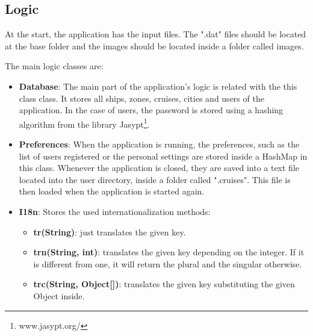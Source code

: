 \documentclass[11pt]{article}
\begin{document}
   \subsection{Logic}
   At the start, the application has the input files. The ".dat" files should be located at the base folder and the images should be located inside a folder called images.
   
   The main logic classes are:
   \begin{itemize}
	   	\item \textbf{Database}: The main part of the application's logic is related with the this class class. It stores all ships, zones, cruises, cities and users of the application. In the case of users, the password is stored using a hashing algorithm from the library Jasypt\footnote{www.jasypt.org/}.
	   	\item \textbf{Preferences}: When the application is running, the preferences, such as the list of users registered or the personal settings are stored inside a HashMap in this class. Whenever the application is closed, they are saved into a text file located into the user directory, inside a folder called ".cruises". This file is then loaded when the application is started again.
	   	\item \textbf{I18n}: Stores the used internationalization methods:
		\begin{itemize}
			\item \textbf{tr(String)}: just translates the given key.
			\item \textbf{trn(String, int)}: translates the given key depending on the integer. If it is different from one, it will return the plural and the singular otherwise.
			\item \textbf{trc(String, Object[])}: translates the given key substituting the given Object inside.
		\end{itemize}
   \end{itemize}
\end{document}
